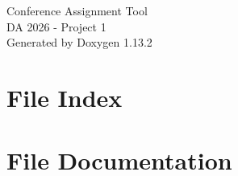 \documentclass[twoside]{book}
\newcommand{\+}{\discretionary{\mbox{\scriptsize$\hookleftarrow$}}{}{}}
\newcommand{\clearemptydoublepage}{%
    \newpage{\pagestyle{empty}\cleardoublepage}%
  }
\begin{document}
  \raggedbottom
    \hypersetup{pageanchor=false,
                bookmarksnumbered=true,
                pdfencoding=unicode
               }
  \begin{titlepage}
  \vspace*{7cm}
  \begin{center}%
  {\Large Conference Assignment Tool}\\
  [1ex]\large DA 2026 -\/ Project 1 \\
  \vspace*{1cm}
  {\large Generated by Doxygen 1.13.2}\\
  \end{center}
  \end{titlepage}
  \clearemptydoublepage
  \tableofcontents
  \clearemptydoublepage
  \hypersetup{pageanchor=true}
\chapter{File Index}

\chapter{File Documentation}





  \backmatter
  \newpage
  \clearemptydoublepage
  \printindex
\end{document}
